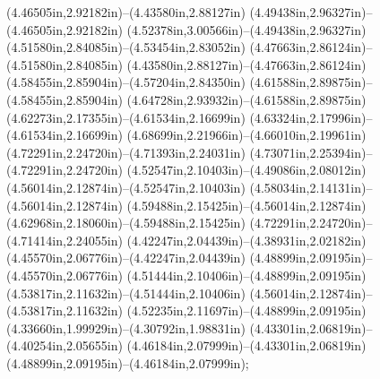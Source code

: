 (4.46505in,2.92182in)--(4.43580in,2.88127in) (4.49438in,2.96327in)--(4.46505in,2.92182in) (4.52378in,3.00566in)--(4.49438in,2.96327in) (4.51580in,2.84085in)--(4.53454in,2.83052in) (4.47663in,2.86124in)--(4.51580in,2.84085in) (4.43580in,2.88127in)--(4.47663in,2.86124in) (4.58455in,2.85904in)--(4.57204in,2.84350in) (4.61588in,2.89875in)--(4.58455in,2.85904in) (4.64728in,2.93932in)--(4.61588in,2.89875in) (4.62273in,2.17355in)--(4.61534in,2.16699in) (4.63324in,2.17996in)--(4.61534in,2.16699in) (4.68699in,2.21966in)--(4.66010in,2.19961in) (4.72291in,2.24720in)--(4.71393in,2.24031in) (4.73071in,2.25394in)--(4.72291in,2.24720in) (4.52547in,2.10403in)--(4.49086in,2.08012in) (4.56014in,2.12874in)--(4.52547in,2.10403in) (4.58034in,2.14131in)--(4.56014in,2.12874in) (4.59488in,2.15425in)--(4.56014in,2.12874in) (4.62968in,2.18060in)--(4.59488in,2.15425in) (4.72291in,2.24720in)--(4.71414in,2.24055in) (4.42247in,2.04439in)--(4.38931in,2.02182in) (4.45570in,2.06776in)--(4.42247in,2.04439in) (4.48899in,2.09195in)--(4.45570in,2.06776in) (4.51444in,2.10406in)--(4.48899in,2.09195in) (4.53817in,2.11632in)--(4.51444in,2.10406in) (4.56014in,2.12874in)--(4.53817in,2.11632in) (4.52235in,2.11697in)--(4.48899in,2.09195in) (4.33660in,1.99929in)--(4.30792in,1.98831in) (4.43301in,2.06819in)--(4.40254in,2.05655in) (4.46184in,2.07999in)--(4.43301in,2.06819in) (4.48899in,2.09195in)--(4.46184in,2.07999in);
